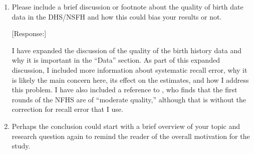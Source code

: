 \documentclass[letterpaper,12pt]{article}
\begin{document}
\begin{enumerate}
[Response:]

I now define spell as the unit of analysis---the period from one parity birth to 
the following birth or censoring---when I first use the word in the ``Estimation 
Strategy'' section.
Furthermore, I clarify that for estimation purposes, spells begin nine months after the 
previous birth, which is the earliest we should expect to observe a new birth.

To make comparisons with both the NFHS reports and the prior literature on
birth spacing easier and avoid confusion, I have rewritten the discussions of 
spacing and redone the graphs and tables, so all results now reflect birth 
intervals in months.
I still retain the use of ``spell'' to indicate a generic period from one parity 
birth to another---i.e., the second spell is from first birth to the second birth or
censoring---in the graphs/tables.


In the Data section, I have also clarified the discussion of the imposed censoring by 
specifying the cut-offs for the spell duration and the birth interval.
In the ``Estimation Strategy'' section, I explain that I add nine months
to the estimated spell length to get to birth intervals.
In the "Mortality and the Changing Birth Spacing" section, I retained the periods but 
updated the numbers to reflect birth intervals rather than pregnancy intervals.


\item Please include a brief discussion or footnote about the quality of
birth date data in the DHS/NSFH and how this could bias your results or
not.

[Response:]

I have expanded the discussion of the quality of the birth history data and why it is
important in the ``Data'' section. 
As part of this expanded discussion, I included more information about systematic recall 
error, why it is likely the main concern here, its effect on the estimates, and how I 
address this problem.
I have also included a reference to \citet{Schoumaker2014}, who finds that the first
rounds of the NFHS are of ``moderate quality,'' although that is without the correction
for recall error that I use.


\item Perhaps the conclusion could start with a brief overview of your
topic and research question again to remind the reader of the overall
motivation for the study.


\end{enumerate}
\end{document}
